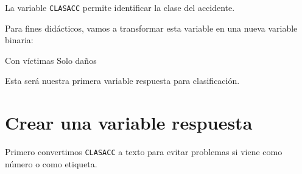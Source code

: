 \documentclass[
  11pt,
  letterpaper,
]{book}
\newenvironment{Shaded}{\begin{snugshade}}{\end{snugshade}}
\newcommand{\NormalTok}[1]{\textcolor[rgb]{0.00,0.23,0.31}{#1}}
\begin{document}
La variable \texttt{CLASACC} permite identificar la clase del accidente.

Para fines didácticos, vamos a transformar esta variable en una nueva
variable binaria:

\begin{Shaded}
\begin{Highlighting}[]
\NormalTok{Con víctimas}
\NormalTok{Solo daños}
\end{Highlighting}
\end{Shaded}

Esta será nuestra primera variable respuesta para clasificación.

\section{Crear una variable
respuesta}\label{crear-una-variable-respuesta}

Primero convertimos \texttt{CLASACC} a texto para evitar problemas si
viene como número o como etiqueta.
\end{document}
